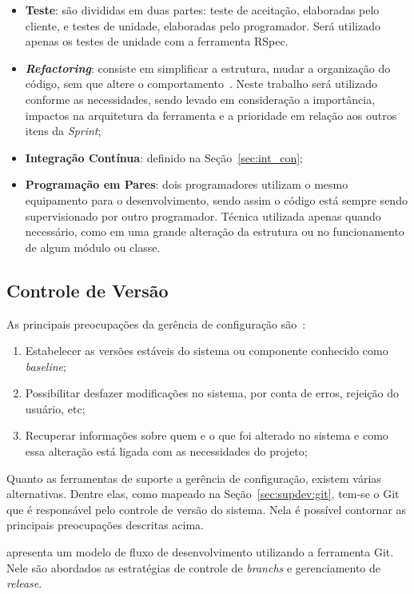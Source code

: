 \begin{itemize}
  \item \textbf{Teste}: são divididas em duas partes: teste de aceitação, elaboradas pelo cliente,
    e testes de unidade, elaboradas pelo programador. Será utilizado apenas os testes
    de unidade com a ferramenta RSpec.
  \item \textit{\textbf{Refactoring}}: consiste em simplificar a estrutura, mudar a organização do código,
    sem que altere o comportamento~\cite{beck:2000}. Neste trabalho será utilizado
    conforme as necessidades, sendo levado em consideração a import{\^a}ncia, impactos na
    arquitetura da ferramenta e a prioridade em relação aos outros itens da \textit{Sprint};
  \item \textbf{Integração Contínua}: definido na Seção~\ref{sec:int_con};
  \item \textbf{Programação em Pares}: dois programadores utilizam o mesmo equipamento para
    o desenvolvimento, sendo assim o código está sempre sendo supervisionado por
    outro programador. Técnica utilizada apenas quando necessário, como em uma grande
    alteração da estrutura ou no funcionamento de algum módulo ou classe.
\end{itemize}

\subsection{Controle de Versão}
\label{sec:ctrl_versao}

As principais preocupações da gerência de configuração são~\cite{koskela2003software}:
\begin{enumerate}
  \item Estabelecer as versões estáveis do sistema ou componente conhecido
    como \textit{baseline};
  \item Possibilitar desfazer modificações no sistema, por conta de erros,
    rejeição do usuário, etc;
  \item Recuperar informações sobre quem e o que foi alterado no sistema e como
    essa alteração está ligada com as necessidades do projeto;
\end{enumerate}

Quanto as ferramentas de suporte a gerência de configuração, existem várias alternativas.
Dentre elas, como mapeado na Seção~\ref{sec:supdev:git}, tem-se o Git que é responsável pelo
controle de versão do sistema. Nela é possível contornar as principais preocupações
descritas acima.

 apresenta um modelo de fluxo de desenvolvimento utilizando a
ferramenta Git. Nele são abordados as estratégias de controle de \textit{branchs} e
gerenciamento de \textit{release}.

